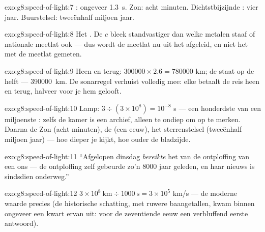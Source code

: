 \begin{solution}{exo:g8:speed-of-light:7}
: ongeveer \qty{1.3}{s}. Zon: acht minuten.
Dichtstbijzijnde : vier jaar. Buurstelsel: tweeënhalf
miljoen jaar.
\end{solution}

\begin{solution}{exo:g8:speed-of-light:8}
Het . De  $c$ bleek standvastiger dan
welke metalen staaf of nationale meetlat ook --- dus wordt de meetlat
nu uit het  afgeleid, en niet het  met de
meetlat gemeten.
\end{solution}

\begin{solution}{exo:g8:speed-of-light:9}
Heen en terug: $300000 \times 2.6 = 780000$ km; de  staat op
de helft --- \qty{390000}{km}. De sonarregel verhuist volledig mee: elke
 betaalt de reis heen en terug, halveer voor je hem gelooft.
\end{solution}

\begin{solution}{exo:g8:speed-of-light:10}
Lamp: $3 \div (3 \times 10^{8}) = 10^{-8}$ s --- een honderdste van een
miljoenste : zelfs de kamer is een archief, alleen te ondiep om
op te merken. Daarna de Zon (acht minuten), de  (een eeuw),
het sterrenstelsel (tweeënhalf miljoen jaar) --- hoe dieper je kijkt,
hoe ouder de bladzijde.
\end{solution}

\begin{solution}{exo:g8:speed-of-light:11}
``Afgelopen dinsdag \emph{bereikte} het  van de ontploffing
van een  ons --- de ontploffing zelf gebeurde zo'n $8000$
jaar geleden, en haar nieuws is sindsdien onderweg.''
\end{solution}

\begin{solution}{exo:g8:speed-of-light:12}
$3 \times 10^{8}\ \text{km} \div 1000\ \text{s} = 3 \times 10^{5}$
\unit{km/s} --- de moderne waarde precies (de historische schatting,
met ruwere baangetallen, kwam binnen ongeveer een kwart ervan uit: voor
de zeventiende eeuw een verbluffend eerste antwoord).
\end{solution}

